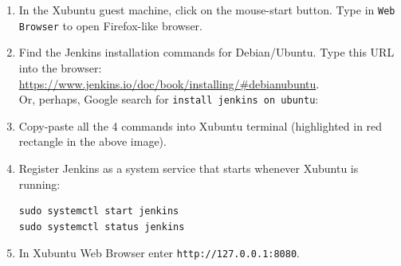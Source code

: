 \documentclass[11pt,a4paper]{article}
\begin{document}
\begin{enumerate}
\item In the Xubuntu guest machine, click on the mouse-start button. Type in {\tt Web Browser}
to open Firefox-like browser. 
\item Find the Jenkins installation commands for Debian/Ubuntu. Type this URL into the browser:
\url{https://www.jenkins.io/doc/book/installing/#debianubuntu}.\\
Or, perhaps, Google search for {\tt install jenkins on ubuntu}:\\
\item Copy-paste all the 4 commands into Xubuntu terminal (highlighted in red
rectangle in the above image).\\
\item Register Jenkins as a system service that starts whenever Xubuntu is running:
\begin{verbatim}
sudo systemctl start jenkins
sudo systemctl status jenkins
\end{verbatim}
\item In Xubuntu Web Browser enter {\tt http://127.0.0.1:8080}.\\

\end{enumerate}
\end{document}
